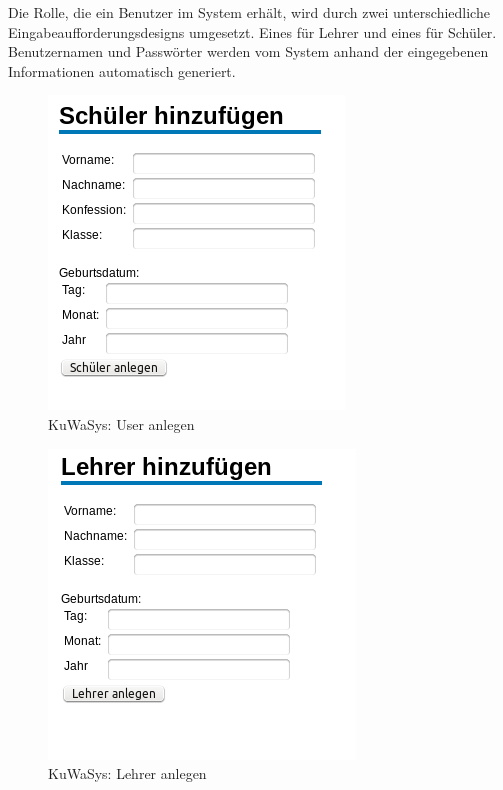 Die Rolle, die ein Benutzer im System erhält, wird durch zwei unterschiedliche Eingabeaufforderungsdesigns umgesetzt. Eines für Lehrer und eines für Schüler. Benutzernamen und Passwörter werden vom System anhand der eingegebenen Informationen automatisch generiert. 

\begin{figure}[H]
 \begin{center}
   \includegraphics[scale=0.6]{img/UserAnlegen_KuWaSys.png}
 \end{center}
 \caption[\textbf{KuWaSys: User anlegen}]{KuWaSys: User anlegen}
 \label{fig:UserAnlegen_KuWaSys}
\end{figure}


\begin{figure}[H]
 \begin{center}
   \includegraphics[scale=0.6]{img/LehrerAnlegen_KuWaSys.png}
 \end{center}
 \caption[\textbf{KuWaSys: Lehrer anlegen}]{KuWaSys: Lehrer anlegen}
 \label{fig:LehrerAnlegen_KuWaSys}
\end{figure}

